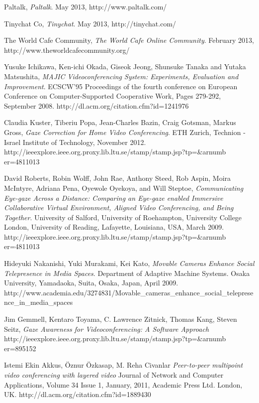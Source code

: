 \documentclass[12pt, titlepage]{article}
\begin{document}
\begin{thebibliography}{9}
  Paltalk,
  \emph{Paltalk}.
  May 2013,
  http://www.paltalk.com/
  
  Tinychat Co,
  \emph{Tinychat}.
  May 2013,
  http://tinychat.com/
  
  The World Cafe Community,
  \emph{The World Cafe Online Community}.
  February 2013,
  http://www.theworldcafecommunity.org/
  
Yusuke Ichikawa, Ken-ichi Okada, Giseok Jeong, Shunsuke Tanaka and Yutaka Matsushita,
\emph{MAJIC Videoconferencing System: Experiments, Evaluation and Improvement}.
ECSCW'95 Proceedings of the fourth conference on European Conference on Computer-Supported Cooperative Work, Pages 279-292, September 2008.
http://dl.acm.org/citation.cfm?id=1241976 


Claudia Kuster, Tiberiu Popa, Jean-Charles Bazin, Craig Gotsman, Markus Gross,
\emph{Gaze Correction for Home Video Conferencing}.
ETH Zurich, Technion - Israel Institute of Technology, November 2012.
http://ieeexplore.ieee.org.proxy.lib.ltu.se/stamp/stamp.jsp?tp=\&arnumb er=4811013

David Roberts, Robin Wolff, John Rae, Anthony Steed, Rob Aspin, Moira McIntyre, Adriana Pena, Oyewole Oyekoya, and Will Steptoe,
\emph{Communicating Eye-gaze Across a Distance: Comparing an Eye-gaze enabled Immersive Collaborative Virtual Environment, Aligned Video Conferencing, and Being Together}.
University of Salford, University of Roehampton, University College London, University of Reading, Lafayette, Louisiana, USA, March 2009.
http://ieeexplore.ieee.org.proxy.lib.ltu.se/stamp/stamp.jsp?tp=\&arnumb er=4811013

Hideyuki Nakanishi, Yuki Murakami, Kei Kato,
\emph{Movable Cameras Enhance Social Telepresence in Media Spaces}.
Department of Adaptive Machine Systems. Osaka University, Yamadaoka, Suita, Osaka, Japan, April 2009.
http://www.academia.edu/3274831/Movable\_cameras\_enhance\_social\linebreak\_telepresence\_in\_media\_spaces

Jim Gemmell, Kentaro Toyama, C. Lawrence Zitnick, Thomas Kang, Steven Seitz,
\emph{Gaze Awareness for Videoconferencing: A Software Approach}
http://ieeexplore.ieee.org.proxy.lib.ltu.se/stamp/stamp.jsp?tp=\&arnumb er=895152

Istemi Ekin Akkus, Öznur Özkasap, M. Reha Civanlar  
\emph{Peer-to-peer multipoint video conferencing with layered video}
Journal of Network and Computer Applications, Volume 34 Issue 1, January, 2011,
Academic Press Ltd. London, UK.
http://dl.acm.org/citation.cfm?id=1889430


\end{thebibliography}
\end{document}
